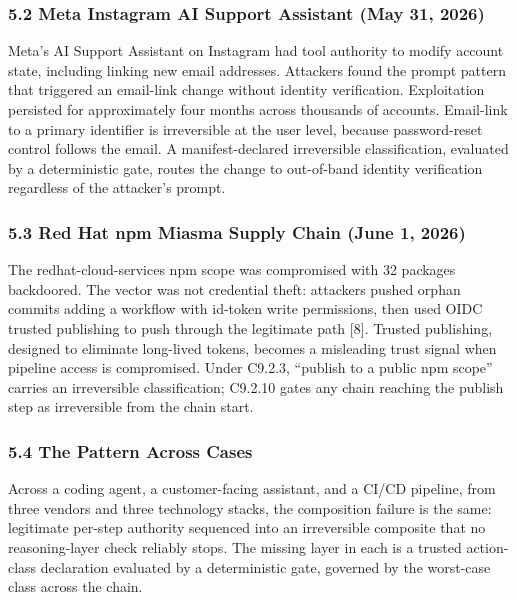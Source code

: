 \documentclass[
  11pt,
]{article}
\begin{document}
\subsubsection{5.2 Meta Instagram AI Support Assistant (May 31,
2026)}\label{meta-instagram-ai-support-assistant-may-31-2026}

Meta's AI Support Assistant on Instagram had tool authority to modify
account state, including linking new email addresses. Attackers found
the prompt pattern that triggered an email-link change without identity
verification. Exploitation persisted for approximately four months
across thousands of accounts. Email-link to a primary identifier is
irreversible at the user level, because password-reset control follows
the email. A manifest-declared irreversible classification, evaluated by
a deterministic gate, routes the change to out-of-band identity
verification regardless of the attacker's prompt.

\subsubsection{5.3 Red Hat npm Miasma Supply Chain (June 1,
2026)}\label{red-hat-npm-miasma-supply-chain-june-1-2026}

The redhat-cloud-services npm scope was compromised with 32 packages
backdoored. The vector was not credential theft: attackers pushed orphan
commits adding a workflow with id-token write permissions, then used
OIDC trusted publishing to push through the legitimate path {[}8{]}.
Trusted publishing, designed to eliminate long-lived tokens, becomes a
misleading trust signal when pipeline access is compromised. Under
C9.2.3, ``publish to a public npm scope'' carries an irreversible
classification; C9.2.10 gates any chain reaching the publish step as
irreversible from the chain start.

\subsubsection{5.4 The Pattern Across
Cases}\label{the-pattern-across-cases}

Across a coding agent, a customer-facing assistant, and a CI/CD
pipeline, from three vendors and three technology stacks, the
composition failure is the same: legitimate per-step authority sequenced
into an irreversible composite that no reasoning-layer check reliably
stops. The missing layer in each is a trusted action-class declaration
evaluated by a deterministic gate, governed by the worst-case class
across the chain.
\end{document}
